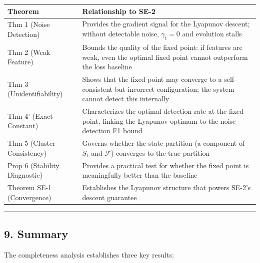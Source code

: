 \documentclass[
  12pt,
]{article}
\begin{document}
\begin{longtable}[]{@{}
  >{\raggedright\arraybackslash}p{}
  >{\raggedright\arraybackslash}p{}@{}}
\toprule\noalign{}
\begin{minipage}[b]{\linewidth}\raggedright
Theorem
\end{minipage} & \begin{minipage}[b]{\linewidth}\raggedright
Relationship to SE-2
\end{minipage} \\
\midrule\noalign{}
\endhead
\bottomrule\noalign{}
\endlastfoot
Thm 1 (Noise Detection) & Provides the gradient signal for the Lyapunov
descent; without detectable noise, \(\gamma_t = 0\) and evolution
stalls \\
Thm 2 (Weak Feature) & Bounds the quality of the fixed point: if
features are weak, even the optimal fixed point cannot outperform the
loss baseline \\
Thm 3 (Unidentifiability) & Shows that the fixed point may converge to a
self-consistent but incorrect configuration; the system cannot detect
this internally \\
Thm 4' (Exact Constant) & Characterizes the optimal detection rate at
the fixed point, linking the Lyapunov optimum to the noise detection F1
bound \\
Thm 5 (Cluster Consistency) & Governs whether the state partition (a
component of \(S_t\) and \(\mathcal{F}\)) converges to the true
partition \\
Prop 6 (Stability Diagnostic) & Provides a practical test for whether
the fixed point is meaningfully better than the baseline \\
Theorem SE-1 (Convergence) & Establishes the Lyapunov structure that
powers SE-2's descent guarantee \\
\end{longtable}

\begin{center}\rule{0.5\linewidth}{0.5pt}\end{center}

\subsection{9. Summary}\label{summary}

The completeness analysis establishes three key results:
\end{document}

